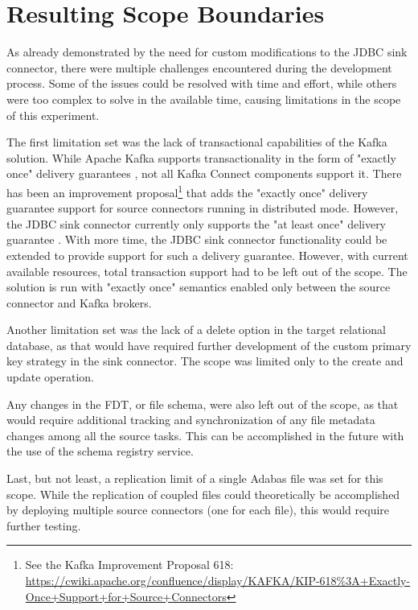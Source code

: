 \section{Resulting Scope Boundaries}
\label{ch04:pipelinedevelopment:solutionlimitations}
As already demonstrated by the need for custom modifications to the \ac{JDBC} sink connector, there were multiple challenges encountered during the development process. Some of the issues could be resolved with time and effort, while others were too complex to solve in the available time, causing limitations in the scope of this experiment.

The first limitation set was the lack of transactional capabilities of the Kafka solution. While Apache Kafka supports transactionality in the form of "exactly once" delivery guarantees \cite{kafkadocumentation}, not all Kafka Connect components support it. There has been an improvement proposal\footnote{See the Kafka Improvement Proposal 618: \url{https://cwiki.apache.org/confluence/display/KAFKA/KIP-618\%3A+Exactly-Once+Support+for+Source+Connectors}} that adds the "exactly once" delivery guarantee support for source connectors running in distributed mode. However, the \ac{JDBC} sink connector currently only supports the "at least once" delivery guarantee \cite{jdbcsinkdocumentation}. With more time, the \ac{JDBC} sink connector functionality could be extended to provide support for such a delivery guarantee. However, with current available resources, total transaction support had to be left out of the scope. The solution is run with "exactly once" semantics enabled only between the source connector and Kafka brokers.

Another limitation set was the lack of a delete option in the target relational database, as that would have required further development of the custom primary key strategy in the sink connector. The scope was limited only to the create and update operation.

Any changes in the \ac{FDT}, or file schema, were also left out of the scope, as that would require additional tracking and synchronization of any file metadata changes among all the source tasks. This can be accomplished in the future with the use of the schema registry service.

Last, but not least, a replication limit of a single Adabas file was set for this scope. While the replication of coupled files could theoretically be accomplished by deploying multiple source connectors (one for each file), this would require further testing.

